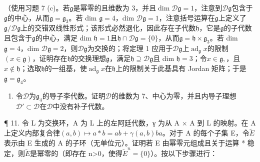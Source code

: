 （使用习题 7 (c)。若\(\mathfrak{g}\)是幂零的且维数为 3，并且\(\dim \mathcal{D}\mathfrak{g} = 1\)，注意到\(\mathcal{D}\mathfrak{g}\)包含于\(\mathfrak{g}\)的中心，从而\(\mathfrak{g} = \mathfrak{g}_3\)。若 dim \(\mathfrak{g} = 4\)，dim \(\mathcal{D}\mathfrak{g} = 1\)，注意括号运算在\(\mathfrak{g}\)上定义了\(\mathfrak{g} / \mathcal{D}\mathfrak{g}\)上的交错双线性形式；该形式必然退化，因此存在子代数\(\mathfrak{h}\)，它是\(\mathfrak{g}\)的子代数且包含于\(\mathfrak{g}\)的中心，满足 dim \(\mathfrak{h} = 1\)且\(\mathfrak{h}\cap \mathcal{D}\mathfrak{g} = \{0\}\)，从而\(\mathfrak{g} = \mathfrak{h}\times \mathfrak{g}_3\)。若 dim \(\mathfrak{g} = 4\)，dim \(\mathcal{D}\mathfrak{g} = 2\)，则\(\mathcal{D}\mathfrak{g}\)为交换的；将定理 1 应用于\(\mathcal{D}\mathfrak{g}\)上\(\operatorname{ad}_{\mathfrak{g}} x\)的限制\((x\in \mathfrak{g})\)，证明存在\(\mathfrak{h}\)的交换理想\(\mathfrak{g}\)，满足\(\mathfrak{h}\supseteq \mathcal{D}\mathfrak{g}\)且 dim \(\mathfrak{h} = 3\)；令\(x\in \mathfrak{g},\)，且\(x\notin \mathfrak{h}\)；选取\(\mathfrak{h}\)的一组基，使\(\operatorname{ad}_{\mathfrak{g}}x\)在\(\mathfrak{h}\)上的限制关于此基具有 Jordan 矩阵；于是\(\mathfrak{g} = \mathfrak{g}_4\)。

\begin{enumerate}
\def\labelenumi{\arabic{enumi}.}
\setcounter{enumi}{9}
\tightlist
\item
  令\(\mathcal{D}\)为\(\mathfrak{g}_4\)的导子李代数。证明\(\mathcal{D}\)的维数为 7、中心为零，并且内导子理想\(\mathcal{D}' \subset \mathcal{D}\)在\(\mathcal{D}\)中没有补子代数。
\end{enumerate}

¶ 11. 令 L 为交换环，A 为 L 上的左阿廷代数，γ 为从 A × A 到 L 的映射。在 A 上定义内部复合律\((a, b) \mapsto a * b = ab + \gamma(a, b)ba\)。对于 A 的每个子集 E，令\(\tilde{E}\)表示由 E 生成的 A 的子环（无单位元）。证明若 E 由幂零元组成且关于运算 * 稳定，则\(\tilde{E}\)是幂零的（即存在 n\textgreater{}0，使得\(\tilde{E}^{n} = \{0\}\)）。按以下步骤进行：

